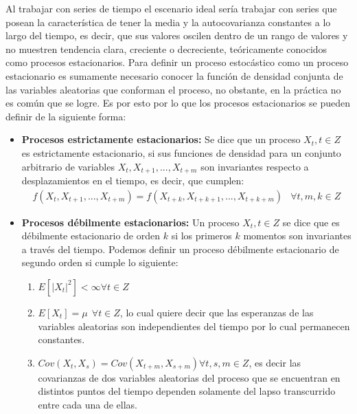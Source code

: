 \documentclass[
  a4paper,
  oneside,
  openany]{book}
\providecommand{\tightlist}{%
  \setlength{\itemsep}{0pt}\setlength{\parskip}{0pt}}
\begin{document}
Al trabajar con series de tiempo el escenario ideal sería trabajar con series que posean la característica de tener la media y la autocovarianza constantes a lo largo del tiempo, es decir, que sus valores oscilen dentro de un rango de valores y no muestren tendencia clara, creciente o decreciente, teóricamente conocidos como procesos estacionarios. Para definir un proceso estocástico como un proceso estacionario es sumamente necesario conocer la función de densidad conjunta de las variables aleatorias que conforman el proceso, no obstante, en la práctica no es común que se logre. Es por esto por lo que los procesos estacionarios se pueden definir de la siguiente forma:

\begin{itemize}
\item
  \textbf{Procesos estrictamente estacionarios:} Se dice que un proceso \(X_t, t \in Z\) es estrictamente estacionario, si sus funciones de densidad para un conjunto arbitrario de variables \(X_t,X_{t+1}, ... , X_{t+m}\) son invariantes respecto a desplazamientos en el tiempo, es decir, que cumplen:
  \[
  \begin{array}{cc}
  f(X_t,X_{t+1}, ... , X_{t+m}) = f(X_{t+k}, X_{t+k+1}, ... , X_{t+k+m}) & \forall t, m, k \in Z
  \end{array}
  \]
\item
  \textbf{Procesos débilmente estacionarios:} Un proceso \(X_t,t\in Z\) se dice que es débilmente estacionario de orden \(k\) si los primeros \(k\) momentos son invariantes a través del tiempo. Podemos definir un proceso débilmente estacionario de segundo orden si cumple lo siguiente:

  \begin{enumerate}
  \def\labelenumi{\arabic{enumi}.}
  \tightlist
  \item
    \(E\left[|X_t|^2\right]< \infty \forall t \in Z\)
  \item
    \(E[X_t] = \mu \ \ \forall t \in Z\), lo cual quiere decir que las esperanzas de las variables aleatorias son independientes del tiempo por lo cual permanecen constantes.
  \item
    \(Cov(X_t,X_s) = Cov (X_{t+m}, X_{s+m}) \forall t, s, m \in Z\), es decir las covarianzas de dos variables aleatorias del proceso que se encuentran en distintos puntos del tiempo dependen solamente del lapso transcurrido entre cada una de ellas.
  \end{enumerate}
\end{itemize}
\end{document}
